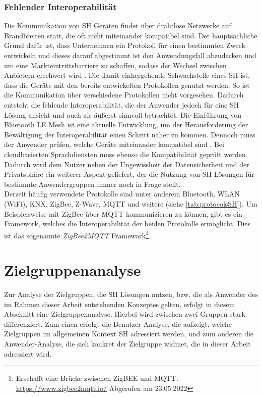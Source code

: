             \subsubsection*{Fehlender Interoperabilität}
                Die Kommunikation von \acl{SH} Geräten findet über drahtlose Netzwerke auf Brandbreiten statt, die oft nicht 
                miteinander kompatibel sind. Der hauptsächliche Grund dafür ist, dass Unternehmen ein Protokoll für einen 
                bestimmten Zweck entwickeln und dieses darauf abgestimmt ist den Anwendungsfall abzudecken und um eine 
                Markteintrittsbarriere zu schaffen, sodass der Wechsel zwischen Anbietern erschwert wird \cite{statista2021}. 
                Die damit einhergehende Schwachstelle eines \acl{SH} ist, dass die Geräte mit den bereits entwickelten 
                Protokollen genutzt werden. So ist die Kommunikation über verschiedene Protokollen nicht vorgesehen. Dadurch 
                entsteht die fehlende Interoperabilität, die der Anwender jedoch für eine \acl{SH} Lösung ansieht und auch 
                als äußerst sinnvoll betrachtet. Die Einführung von Bluetooth LE Mesh ist eine aktuelle Entwicklung, um der 
                Herausforderung der Bewältigung der Interoperabilität einen Schritt näher zu kommen. Dennoch muss der 
                Anwender prüfen, welche Geräte miteinander kompatibel sind \cite{statista2021}. Bei cloudbasierten 
                Sprachdiensten muss ebenso die Kompatibilität geprüft werden. 
                Dadurch wird dem Nutzer neben der Ungewissheit der Datensicherheit und der Privatsphäre ein weiterer Aspekt 
                geliefert, der die Nutzung von \acl{SH} Lösungen für bestimmte Anwendergruppen immer noch in Frage stellt.
                \\ 
                \linebreak
                Derzeit häufig verwendete Protokolle sind unter anderem Bluetooth, \ac{WLAN} (WiFi), KNX, ZigBee, Z-Wave, 
                MQTT und weitere (siehe \ref{tab:protocolsSH}). Um Beispielsweise mit ZigBee über \acs{MQTT} kommunizieren zu 
                können, gibt es ein Framework, welches die Interoperabilität der beiden Protokolle ermöglicht. Dies ist das 
                sogenannte \textit{ZigBee2MQTT} Framework\footnote{Erschafft eine Brücke zwischen ZigBEE und MQTT. \url{https://www.zigbee2mqtt.io/} Abgerufen am 23.05.2022}.

\section{Zielgruppenanalyse}
\label{sec:zielgruppenanalyse}
    Zur Analyse der Zielgruppen, die \acl{SH} Lösungen nutzen, bzw. die als Anwender des im Rahmen dieser Arbeit 
    entstehenden Konzeptes gelten, erfolgt in diesem Abschnitt eine Zielgruppenanalyse. Hierbei wird zwischen 
    zwei Gruppen stark differenziert. Zum einen erfolgt die Benutzer-Analyse, die aufzeigt, welche Zielgruppen 
    im allgemeinen Kontext \acl{SH} adressiert werden, und zum anderen die Anwender-Analyse, die sich 
    konkret der Zielgruppe widmet, die in dieser Arbeit adressiert wird. 
    
